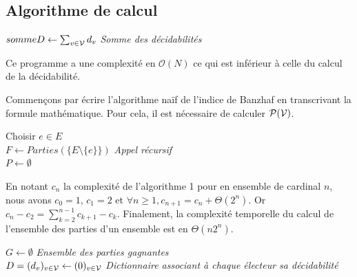 \subsection{Algorithme de calcul}

\begin{algorithm}[H]
	\caption{Calcul de l'indice de Banzhaf normalisé}
	$sommeD \gets \sum_{v \in \mathcal{V}} d_v$ \quad \emph{Somme des décidabilités} \\
\end{algorithm}

Ce programme a une complexité en $\mathcal{O}(N)$ ce qui est inférieur à celle du calcul de la décidabilité.

Commençons par écrire l'algorithme naïf de l'indice de Banzhaf en transcrivant la formule mathématique.
Pour cela, il est nécessaire de calculer $\mathcal{P}(\mathcal{V})$.

\begin{algorithm}[H]
	\caption{Calcul de l'ensemble des parties d'un ensemble}
	Choisir $e \in E$ \\
	
$F \gets Parties(\{ E \setminus \{e\} \})$ \quad \emph{Appel récursif} \\
	$P \gets \emptyset$ \\
\end{algorithm}

En notant $c_n$ la complexité de l'algorithme 1 pour en ensemble de cardinal $n$, nous avons $c_0 = 1$, $c_1 = 2$ et $\forall n \geqslant 1, c_{n+1} = c_n + \Theta(2^n)$.
Or $c_n - c_2 = \sum_{k=2}^{n-1} c_{k+1} - c_k$.
Finalement, la complexité temporelle du calcul de l'ensemble des parties d'un ensemble est en $\Theta(n 2^n)$.

\begin{algorithm}[H]
	\caption{Calcul naïf de la décidabilité}
	$G \gets \emptyset$ \quad \emph{Ensemble des parties gagnantes} \\
	$D = (d_v)_{v \in \mathcal{V}} \gets (0)_{v \in \mathcal{V}}$ \quad \emph{Dictionnaire associant à chaque électeur sa décidabilité} \\
\end{algorithm}

